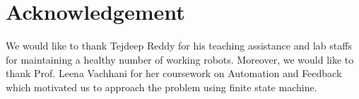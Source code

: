 \documentclass{report}[12pt]
\begin{document}
\section{Acknowledgement}
We would like to thank Tejdeep Reddy for his teaching assistance and lab staffs for maintaining a healthy number of working robots. Moreover, we would like to thank Prof. Leena Vachhani for her coursework on Automation and Feedback which motivated us to approach the problem using finite state machine.
{}

\end{document}
